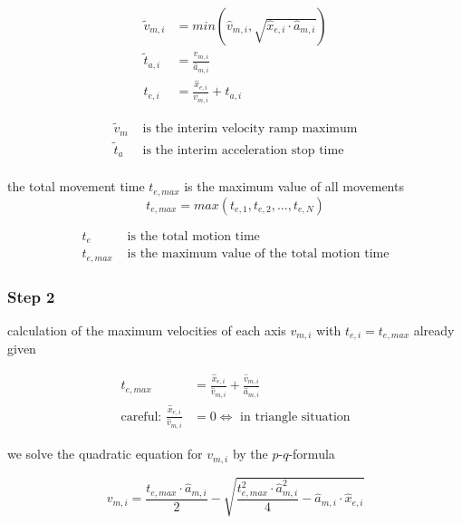 \documentclass[%
  professionalfonts,%
  xcolor={%
    usenames,%
    dvipsnames,%
    svgnames,%
    table,%
    hyperref%
  }%
]{beamer}
\begin{document}
\begin{frame}
\begin{align*}
\tilde{v}_{m,i} & = min(\hat{v}_{m,i},\sqrt{\hat{x}_{e,i} \cdot \hat{a}_{m,i}}) \\
\tilde{t}_{a,i} & = \frac{v_{m,i}}{\hat{a}_{m,i}}\\
t_{e,i} & = \frac{\hat{x}_{e,i}}{v_{m,i}} + t_{a,i}
\end{align*}

\begin{align*}
\tilde{v}_{m} & \text{ is the interim velocity ramp maximum}\\
\tilde{t}_{a} & \text{ is the interim acceleration stop time}\\
\end{align*}                 
\end{frame}

\begin{frame}
the total movement time $t_{e,max}$ is the maximum value of all movements
\begin{equation*}
t_{e,max} = max(t_{e,1},t_{e,2},...,t_{e,N})
\end{equation*}

\begin{align*}
t_{e} & \text{ is the total motion time } \\
t_{e,max} & \text{ is the maximum value of the total motion time}      
\end{align*}
\end{frame}
  
\subsubsection{Step 2}
\begin{frame}
calculation of the maximum velocities of each axis $v_{m,i}$ with $t_{e,i} = t_{e,max}$ already given

\begin{align*}
t_{e,max} & = \frac{\hat{x}_{e,i}}{\hat{v}_{m,i}}+\frac{\hat{v}_{m,i}}{\hat{a}_{m,i}} \\
\text{careful: } \frac{\hat{x}_{e,i}}{\hat{v}_{m,i}} & = 0 \iff \text{ in triangle situation}
\end{align*}

we solve the quadratic equation for $v_{m,i}$ by the $p$-$q$-formula

\begin{equation*}
v_{m,i} = \frac{t_{e,max} \cdot \hat{a}_{m,i}}{2}-\sqrt{\frac{t_{e,max}^2 \cdot \hat{a}_{m,i}^2}{4}-\hat{a}_{m,i}\cdot \hat{x}_{e,i}}
\end{equation*}

\end{frame}
  
\end{document}
